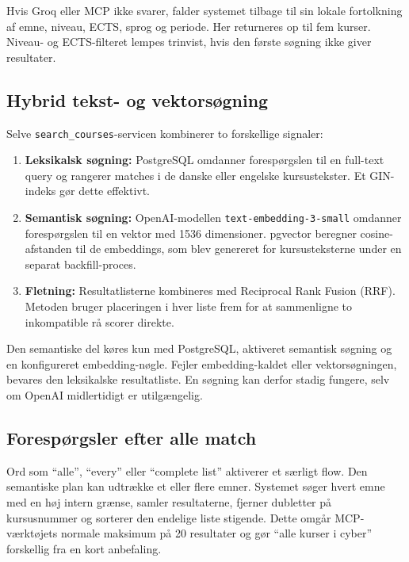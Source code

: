 \documentclass[11pt,a4paper]{article}
\newcommand{\code}[1]{\texttt{#1}}
\begin{document}
Hvis Groq eller MCP ikke svarer, falder systemet tilbage til sin lokale
fortolkning af emne, niveau, ECTS, sprog og periode. Her returneres op til fem
kurser. Niveau- og ECTS-filteret lempes trinvist, hvis den første søgning ikke
giver resultater.

\subsection{Hybrid tekst- og vektorsøgning}

Selve \code{search\_courses}-servicen kombinerer to forskellige signaler:

\begin{enumerate}
  \item \textbf{Leksikalsk søgning:} PostgreSQL omdanner forespørgslen til en
  full-text query og rangerer matches i de danske eller engelske kursustekster.
  Et GIN-indeks gør dette effektivt.
  \item \textbf{Semantisk søgning:} OpenAI-modellen
  \code{text-embedding-3-small} omdanner forespørgslen til en vektor med 1536
  dimensioner. pgvector beregner cosine-afstanden til de embeddings, som blev
  genereret for kursusteksterne under en separat backfill-proces.
  \item \textbf{Fletning:} Resultatlisterne kombineres med Reciprocal Rank
  Fusion (RRF). Metoden bruger placeringen i hver liste frem for at sammenligne
  to inkompatible rå scorer direkte.
\end{enumerate}

Den semantiske del køres kun med PostgreSQL, aktiveret semantisk søgning og en
konfigureret embedding-nøgle. Fejler embedding-kaldet eller vektorsøgningen,
bevares den leksikalske resultatliste. En søgning kan derfor stadig fungere,
selv om OpenAI midlertidigt er utilgængelig.

\subsection{Forespørgsler efter alle match}

Ord som ``alle'', ``every'' eller ``complete list'' aktiverer et særligt flow.
Den semantiske plan kan udtrække et eller flere emner. Systemet søger hvert
emne med en høj intern grænse, samler resultaterne, fjerner dubletter på
kursusnummer og sorterer den endelige liste stigende. Dette omgår MCP-
værktøjets normale maksimum på 20 resultater og gør ``alle kurser i cyber''
forskellig fra en kort anbefaling.
\end{document}
